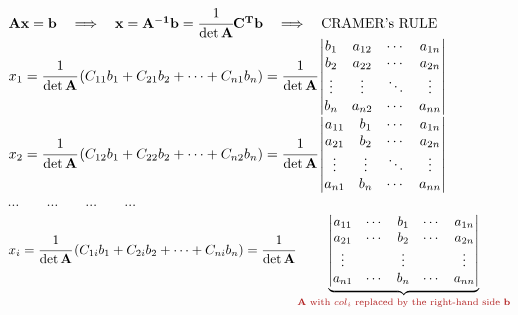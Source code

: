 \documentclass[12pt, a4paper]{article}
\begin{document}
{\vspace{14pt}
\newline
\begin{math}
	{\mathbf{A}}{\mathbf{x}} = {\mathbf{b}}
	\quad\Longrightarrow\quad
	{\mathbf{x}} = {\mathbf{A^{-1}}}{\mathbf{b}} = \cfrac{1}{\det{\mathbf{A}}}{\mathbf{C^{T}}}{\mathbf{b}}
	\quad\Longrightarrow\quad
	{\text{CRAMER's RULE}}
\end{math}
\vspace{14pt}
\newline
\begin{math}
	x_1 = 
	\cfrac{1}{\det{\mathbf{A}}}
	\left(
	C_{11}b_1 + C_{21}b_2 + \cdots + C_{n1}b_n
	\right)
	=
	\cfrac{1}{\det{\mathbf{A}}}
	\begin{vmatrix}
		b_1 & a_{12} & \cdots & a_{1n} \\
		b_2 & a_{22} & \cdots & a_{2n} \\
		\vdots & \vdots & \ddots & \vdots \\
		b_n & a_{n2} & \cdots & a_{nn} 
	\end{vmatrix}
\end{math}
\newline
\begin{math}
	x_2 = 
	\cfrac{1}{\det{\mathbf{A}}}
	\left(
	C_{12}b_1 + C_{22}b_2 + \cdots + C_{n2}b_n
	\right)
	=
	\cfrac{1}{\det{\mathbf{A}}}
	\begin{vmatrix}
		a_{11} & b_1 & \cdots & a_{1n} \\
		a_{21} & b_2 & \cdots & a_{2n} \\
		\vdots & \vdots & \ddots & \vdots \\
		a_{n1} & b_n & \cdots & a_{nn} 
	\end{vmatrix}
\end{math}
\newline
$\cdots \qquad \cdots \qquad \cdots \qquad \cdots$
\newline
\begin{math}
	x_i = 
	\cfrac{1}{\det{\mathbf{A}}}
	\left(
	C_{1i}b_1 + C_{2i}b_2 + \cdots + C_{ni}b_n
	\right)
	=
	\cfrac{1}{\det{\mathbf{A}}}
	\underbrace{
		\begin{vmatrix}
			a_{11} & \cdots & b_1 & \cdots & a_{1n} \\
			a_{21} & \cdots & b_2 & \cdots & a_{2n} \\
			\vdots & \ & \vdots & \ & \vdots \\
			a_{n1} & \cdots & b_n & \cdots & a_{nn} 
		\end{vmatrix}
	}_{\textcolor{anhao-scarlet}{{\mathbf{A}}{\text{ with }}col_i{\text{ replaced by the right-hand side }}{\mathbf{b}}}}

\end{math}}
\end{document}
